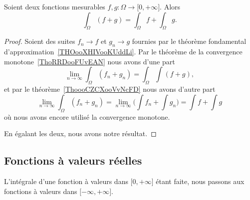 \begin{proposition} \label{PROPooOVDEooDJvOau}
    Soient deux fonctions mesurables \( f,g\colon \Omega\to \mathopen[ 0 , +\infty \mathclose]\). Alors
    \begin{equation}
        \int_{\Omega}(f+g)=\int_{\Omega}f+\int_{\Omega}g.
    \end{equation}
\end{proposition}

\begin{proof}
    Soient des suites \( f_n\to f\) et \( g_n\to g\) fournies par le théorème fondamental d'approximation~\ref{THOooXHIVooKUddLi}. Par le théorème de la convergence monotone~\ref{ThoRRDooFUvEAN} nous avons d'une part
    \begin{equation}
        \lim_{n\to \infty} \int_{\Omega}(f_n+g_n)=\int_{\Omega}\int(f+g),
    \end{equation}
    et par le théorème~\ref{ThoooCZCXooVvNcFD} nous avons d'autre part
    \begin{equation}
        \lim_{n\to \infty} \int_{\Omega}(f_n+g_n)=\lim_{n\to \infty} \big( \int f_n+\int g_n \big)=\int f+\int g
    \end{equation}
    où nous avons encore utilisé la convergence monotone.

    En égalant les deux, nous avons notre résultat.
\end{proof}

\subsection{Fonctions à valeurs réelles}

L'intégrale d'une fonction à valeurs dans \( \mathopen[ 0 , +\infty \mathclose]\) étant faite, nous passons aux fonctions à valeurs dans \( \mathopen[ -\infty, +\infty \mathclose]\).


